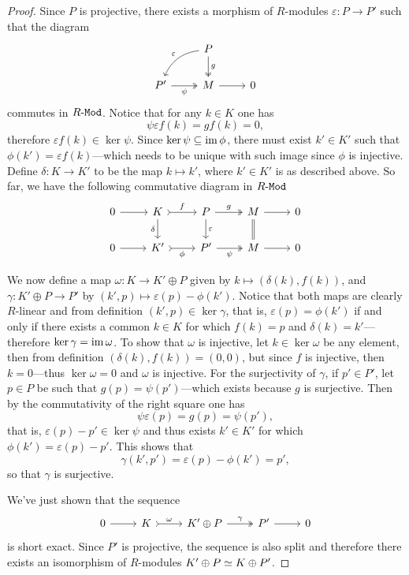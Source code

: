 \begin{proof}
Since \(P\) is projective, there exists a morphism of \(R\)-modules
\(\varepsilon: P \to P'\) such that the diagram
\[
\begin{tikzcd}
&P \ar[d, two heads, "g"] \ar[ld, bend right, "\varepsilon"'] &
\\
P' \ar[r, two heads, "\psi"'] &M \ar[r] &0
\end{tikzcd}
\]
commutes in \({R\text{-}\texttt{Mod}}\). Notice that for any \(k \in K\) one has
\[
\psi \varepsilon f(k) = g f(k) = 0,
\]
therefore \(\varepsilon f(k) \in \ker \psi\). Since
\(\ker \psi \subseteq \operatorname{im} \phi\), there must exist \(k' \in K'\) such that
\(\phi(k') = \varepsilon f(k)\)---which needs to be unique with such image since
\(\phi\) is injective. Define \(\delta: K \to K'\) to be the map
\(k \mapsto k'\), where \(k' \in K'\) is as described above. So far, we have the
following commutative diagram in \({R\text{-}\texttt{Mod}}\)
\[
\begin{tikzcd}
0 \ar[r]
&K \ar[r, tail, "f"] \ar[d, "\delta"']
&P \ar[r, two heads, "g"] \ar[d, "\varepsilon"]
&M \ar[r] \ar[d, equals]
&0
\\
0 \ar[r] &K' \ar[r, tail, "\phi"'] &P' \ar[r, two heads, "\psi"'] &M \ar[r] &0
\end{tikzcd}
\]

We now define a map \(\omega: K \to K' \oplus P\) given by
\(k \mapsto (\delta(k), f(k))\), and \(\gamma: K' \oplus P \to P'\) by
\((k', p) \mapsto \varepsilon(p) - \phi(k')\). Notice that both maps are clearly
\(R\)-linear and from definition \((k', p) \in \ker \gamma\), that is,
\(\varepsilon(p) = \phi(k')\) if and only if there exists a common \(k \in K\)
for which \(f(k) = p\) and \(\delta(k) = k'\)---therefore
\(\ker \gamma = \operatorname{im} \omega\). To show that \(\omega\) is injective, let
\(k \in \ker \omega\) be any element, then from definition
\((\delta(k), f(k)) = (0, 0)\), but since \(f\) is injective, then
\(k = 0\)---thus \(\ker \omega = 0\) and \(\omega\) is injective. For the
surjectivity of \(\gamma\), if \(p' \in P'\), let \(p \in P\) be such that
\(g(p) = \psi(p')\)---which exists because \(g\) is surjective. Then by the
commutativity of the right square one has
\[
\psi \varepsilon(p) = g(p) = \psi(p'),
\]
that is, \(\varepsilon(p) - p' \in \ker \psi\) and thus exists \(k' \in K'\) for
which \(\phi(k') = \varepsilon(p) - p'\). This shows that
\[
\gamma(k', p') = \varepsilon(p) - \phi(k') = p',
\]
so that \(\gamma\) is surjective.

We've just shown that the sequence
\[
\begin{tikzcd}
0 \ar[r]
&K \ar[r, tail, "\omega"]
&K' \oplus P \ar[r, two heads, "\gamma"]
&P' \ar[r]
&0
\end{tikzcd}
\]
is short exact. Since \(P'\) is projective, the sequence is also split and
therefore there exists an isomorphism of \(R\)-modules
\(K' \oplus P \simeq K \oplus P'\).
\end{proof}

